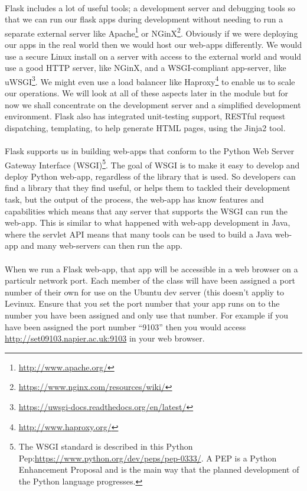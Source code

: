 \documentclass[12pt, a4paper, twoside]{book}
\begin{document}
\paragraph{} Flask includes a lot of useful tools; a development server and debugging tools so that we can run our flask apps during development without needing to run a separate external server like Apache\footnote{\url{http://www.apache.org/}} or NGinX\footnote{\url{https://www.nginx.com/resources/wiki/}}. Obviously if we were deploying our apps in the real world then we would host our web-apps differently. We would use a secure Linux install on a server with access to the external world and would use a good HTTP server, like NGinX, and a WSGI-compliant app-server, like uWSGI\footnote{\url{https://uwsgi-docs.readthedocs.org/en/latest/}}. We might even use a load balancer like Haproxy\footnote{\url{http://www.haproxy.org/}} to enable us to scale our operations. We will look at all of these aspects later in the module but for now we shall concentrate on the development server and a simplified development environment. Flask also has integrated unit-testing support, RESTful request dispatching, templating, to help generate HTML pages, using the Jinja2 tool.

\paragraph{} Flask supports us in building web-apps that conform to the Python Web Server Gateway Interface (WSGI)\footnote{The WSGI standard is described in this Python Pep:\url{https://www.python.org/dev/peps/pep-0333/}. A PEP is a Python Enhancement Proposal and is the main way that the planned development of the Python language progresses.}. The goal of WSGI is to make it easy to develop and deploy Python web-app, regardless of the library that is used. So developers can find a library that they find useful, or helps them to tackled their development task, but the output of the process, the web-app has know features and capabilities which means that any server that supports the WSGI can run the web-app. This is similar to what happened with web-app development in Java, where the servlet API means that many tools can be used to build a Java web-app and many web-servers can then run the app.

\paragraph{} When we run a Flask web-app, that app will be accessible in a web browser on a particulr network port. Each member of the class will have been assigned a port number of their own for use on the Ubuntu dev server (this doesn't appliy to Levinux. Ensure that you set the port number that your app runs on to the number you have been assigned and only use that number. For example if you have been assigned the port number ``9103'' then you would access \url{http://set09103.napier.ac.uk:9103} in your web browser.
\end{document}
